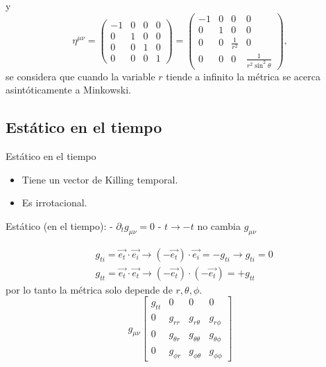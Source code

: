 y
\begin{equation}
    \eta^{\mu \nu}=\left(\begin{array}{cccc}
            -1 & 0 & 0 & 0 \\
            0  & 1 & 0 & 0 \\
            0  & 0 & 1 & 0 \\
            0  & 0 & 0 & 1
        \end{array}\right)=\left(\begin{array}{cccc}
            -1 & 0 & 0               & 0                                \\
            0  & 1 & 0               & 0                                \\
            0  & 0 & \frac{1}{r^{2}} & 0                                \\
            0  & 0 & 0               & \frac{1}{r^{2} \sin ^{2} \theta}
        \end{array}\right),
\end{equation}
se considera que cuando la variable $r$ tiende a infinito la métrica se acerca asintóticamente a Minkowski.

\subsection{Estático en el tiempo }
\begin{definition}{Estático en el tiempo}{}
    \begin{itemize}
        \item Tiene un vector de Killing temporal.
        \item Es irrotacional.
    \end{itemize}
\end{definition}
Estático (en el tiempo):
- $\partial_t g_{\mu \nu}=0$
- $t \rightarrow -t$ no cambia $g_{\mu \nu}$

\begin{align}
     & g_{t i}=\overrightarrow{e_t} \cdot \overrightarrow{e_i} \rightarrow\left(-\overrightarrow{e_t}\right) \cdot \overrightarrow{e_i}=-g_{t i}\rightarrow g_{t i}=0 \\
     & g_{t t}=\overrightarrow{e_t} \cdot \overrightarrow{e_t} \rightarrow\left(-\overrightarrow{e_t}\right) \cdot\left(-\overrightarrow{e_t}\right)=+g_{t t}
\end{align}
por lo tanto la métrica solo depende de $r, \theta, \phi$.
\begin{equation}
    g_{\mu \nu} \left[\begin{array}{cccc}
            g_{t t} & 0            & 0                 & 0               \\
            0       & g_{r r}      & g_{r \theta}      & g_{r \phi}      \\
            0       & g_{\theta r} & g_{\theta \theta} & g_{\theta \phi} \\
            0       & g_{\phi r}   & g_{\phi \theta}   & g_{\phi \phi}
        \end{array}\right]
\end{equation}

